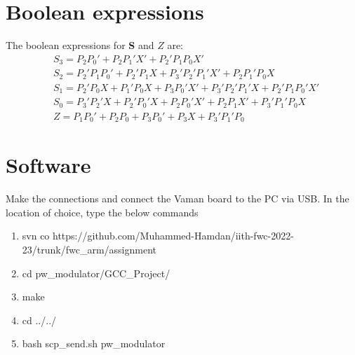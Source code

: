\documentclass[journal,10pt,twocolumn]{article}
\begin{document}
\section*{\large Boolean expressions}
The boolean expressions for \textbf{S} and $Z$ are:
\begin{align*} %
&S_3 = P_2P_0' + P_2P_1'X' + P_2'P_1P_0X'\\
&S_2 = P_2'P_1P_0' + P_2'P_1X + P_3'P_2'P_1'X' + P_2P_1'P_0X\\
&S_1 = P_2'P_0X + P_1'P_0X + P_3P_0'X' + P_3'P_2'P_1'X + P_2'P_1P_0'X'\\
&S_0 = P_3'P_2'X + P_2'P_0'X + P_2P_0'X' + P_2P_1X' + P_3'P_1'P_0X\\
&Z = P_1P_0' + P_2P_0 + P_3P_0' + P_3X + P_3'P_1'P_0
\end{align*}

\section*{\large Software}
Make the connections and connect the Vaman board to the PC via USB. In the location of choice, type the below commands
\begin{enumerate}
\item svn co https://github.com/Muhammed-Hamdan/iith-fwc-2022-23/trunk/fwc\_arm/assignment
\item cd pw\_modulator/GCC\_Project/
\item make
\item cd ../../
\item bash scp\_send.sh pw\_modulator
\end{enumerate}
\end{document}
